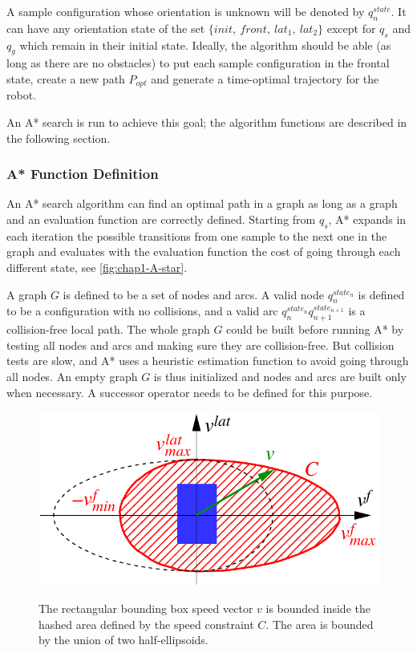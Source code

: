 A sample configuration whose orientation is unknown will be denoted by
$q_n^{state}$. It can have any orientation state of the set
$\{init,~front,~lat_1,~lat_2\}$ except for $q_s$ and $q_g$ which
remain in their initial state.  Ideally, the algorithm should be able
(as long as there are no obstacles) to put each sample configuration
in the frontal state, create a new path $P_{opt}$ and generate a
time-optimal trajectory for the robot.

An A* search is run to achieve this goal; the algorithm functions are
described in the following section.

\subsubsection{A* Function Definition}
\label{sec:chap1-A-star}
An A* search algorithm can find an optimal path in a graph
as long as a graph and an evaluation function are correctly
defined. Starting from $q_s$, A* expands in each iteration the
possible transitions from one sample to the next one in the graph and
evaluates with the evaluation function the cost of going through each
different state, see \autoref{fig:chap1-A-star}.

A graph $G$ is defined to be a set of nodes and arcs. A valid node
$q_n^{state_n}$ is defined to be a configuration with no collisions, and a valid arc
$q_n^{state_n}q_{n+1}^{state_{n+1}}$ is a collision-free local
path. The whole graph $G$ could be built before running A* by testing
all nodes and arcs and making sure they are collision-free. But
collision tests are slow, and A* uses a heuristic estimation function
to avoid going through all nodes. An empty graph $G$ is thus
initialized and nodes and arcs are built only when necessary. A
successor operator needs to be defined for this purpose.

\begin{figure}
  \centering
      {\includegraphics[width = 0.75\linewidth]
        {src/chap1-path-optimization/elliptic-constraint.pdf}}
      \caption{The rectangular bounding box speed vector $v$ is
        bounded inside the hashed area defined by the speed constraint
        $C$. The area is bounded by the union of two half-ellipsoids.}
      \label{fig:chap1-elliptic-constraint}
\end{figure}

